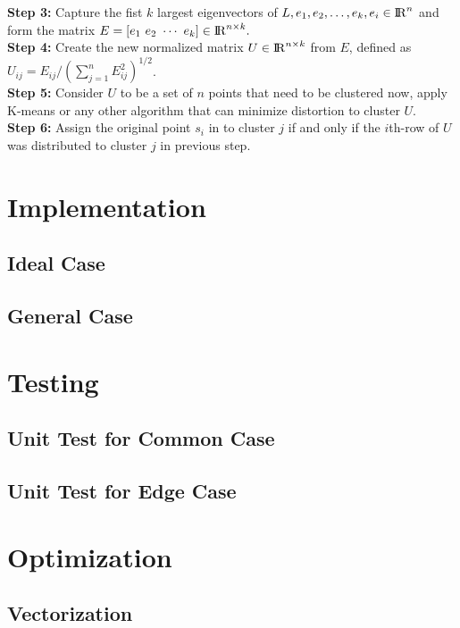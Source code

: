 \documentclass[11pt]{article}
\begin{document}
\textbf{Step 3:} Capture the fist $k$ largest eigenvectors of $L, e_1, e_2,  \ldots, e_k, e_i \in {\rm I\!R}^{n} $ and form the matrix $E = [e_1 ~e_2 ~\cdots ~e_k ] \in  {\rm I\!R}^{n\times k}.$\\

\textbf{Step 4:} Create the new normalized matrix $U \in {\rm I\!R}^{n\times k}$ from $E$, defined as $U_{ij}= E_{ij}/(\sum_{j=1}^{n}E_{ij}^2)^{1/2}$. \\

\textbf{Step 5:} Consider $U$ to be a set of $n$   points that need to be clustered now, apply K-means or any other algorithm that can minimize distortion to cluster $U$. \\

\textbf{Step 6:}  Assign the original point $s_i$ in to cluster $j$ if and only if the $i$th-row of $U$ was distributed to cluster $j$  in previous step.       \\


\section{Implementation}
\subsection{Ideal Case }
\subsection{General Case}


\section{Testing}
\subsection{Unit  Test for Common Case}
\subsection{Unit Test for Edge Case}

\section{Optimization}

\subsection{Vectorization}
\end{document}

